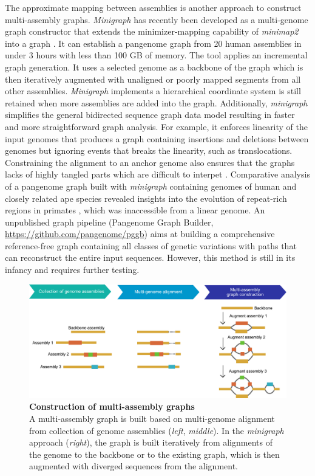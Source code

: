 \documentclass[../main.tex]{subfiles}
\begin{document}
The approximate mapping between assemblies is another approach to construct multi-assembly graphs. \emph{Minigraph} \citep{li2020design} has recently been developed as a multi-genome graph constructor that extends the minimizer-mapping capability of \emph{minimap2} into a graph \citep{li2018minimap2}. It can establish a pangenome graph from 20 human assemblies in under 3 hours with less than 100 GB of memory. The tool applies an incremental graph generation. It uses  a selected genome as a backbone of the graph which is then iteratively augmented with unaligned or poorly mapped segments from all other assemblies. \emph{Minigraph} implements a hierarchical coordinate system is still retained when more assemblies are added into the graph. 
Additionally, \emph{minigraph} simplifies the general bidirected sequence graph data model resulting in faster and more straightforward graph analysis. For example, it enforces linearity of the input genomes that produces a graph containing insertions and deletions between genomes but ignoring events that breaks the linearity, such as translocations. Constraining the alignment to an anchor genome also ensures that the graphs lacks of highly tangled parts which are difficult to interpet \citep{Lei2021}. Comparative analysis of a pangenome graph built with \emph{minigraph} containing genomes of human and closely related ape species revealed insights into the evolution of repeat-rich regions in primates \citep{li2020design}, which was inaccessible from a linear genome. An unpublished graph pipeline (Pangenome Graph Builder, \url{https://github.com/pangenome/pggb}) aims at building a comprehensive reference-free graph containing all classes of genetic variations with paths that can reconstruct the entire input sequences. However, this method is still in its infancy and requires further testing. \\

\begin{figure}[!htb]
    \centering
    \includegraphics[width=\textwidth]{intro/fig7.pdf}
        \vspace{3mm}
        \caption[Construction of multi-assembly graphs]{\textbf{Construction of multi-assembly graphs} \\
        \footnotesize{A multi-assembly graph is built based on multi-genome alignment from collection of genome assemblies (\emph{left}, \emph{middle}). In the \emph{minigraph} approach (\emph{right}), the graph is built iteratively from alignments of the genome to the backbone or to the existing graph, which is then augmented with diverged sequences from the alignment.}}
        \label{fig17:multi}
\end{figure}
\end{document}

